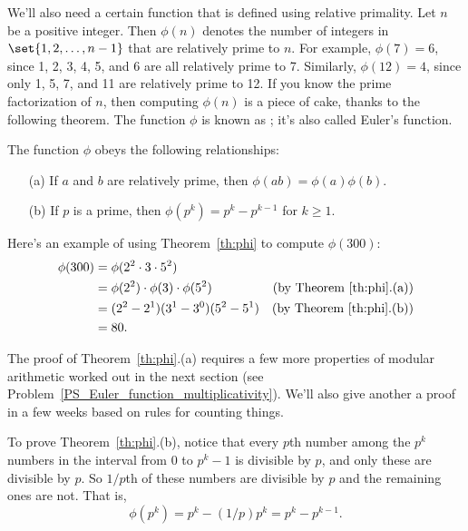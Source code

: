 We'll also need a certain function that is defined using relative
primality.  Let $n$ be a positive integer.  Then $\phi(n)$ denotes the
number of integers in $\set{1, 2, \dots, n - 1}$ that are relatively prime
to $n$.  For example, $\phi(7) = 6$, since 1, 2, 3, 4, 5, and 6 are all
relatively prime to 7.  Similarly, $\phi(12) = 4$, since only 1, 5, 7, and
11 are relatively prime to 12.  If you know the prime factorization of
$n$, then computing $\phi(n)$ is a piece of cake, thanks to the following
theorem.  The function $\phi$ is known as ;
it's also called Euler's \emph{} function.

\begin{theorem}
\label{th:phi}
The function $\phi$ obeys the following relationships:
\begin{enumerate}
\item[(a)] If $a$ and $b$ are relatively prime, then $\phi(ab) = \phi(a)\phi(b)$.
\item[(b)] If $p$ is a prime, then $\phi(p^k) = p^k - p^{k-1}$ for $k \geq 1$.
\end{enumerate}
\end{theorem}

Here's an example of using Theorem~\ref{th:phi} to compute $\phi(300)$:
%
\begin{align*}
\phi(300)
    & = \phi(2^2 \cdot 3 \cdot 5^2)\\
    & = \phi(2^2) \cdot \phi(3) \cdot \phi(5^2)
            & \text{(by Theorem~\ref{th:phi}.(a))}\\
    & = (2^2 - 2^1) (3^1 - 3^0) (5^2 - 5^1) 
            & \text{(by Theorem~\ref{th:phi}.(b))}\\
    & = 80.
\end{align*}

The proof of Theorem~\ref{th:phi}.(a) requires a few more properties of
modular arithmetic worked out in the next section (see
Problem~\ref{PS_Euler_function_multiplicativity}).  We'll also give
another a proof in a few weeks based on rules for counting things.

To prove Theorem~\ref{th:phi}.(b), notice that every $p$th number
among the $p^k$ numbers in the interval from 0 to $p^{k}-1$ is
divisible by $p$, and only these are divisible by $p$.  So $1/p$th of
these numbers are divisible by $p$ and the remaining ones are not.  That is,
\[
\phi(p^{k}) = p^k - (1/p)p^k = p^k -p^{k-1}.
\]

